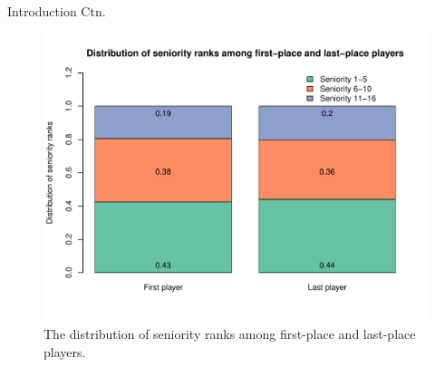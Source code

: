 \begin{frame}{Introduction Ctn.}
    \begin{figure}
        \centering
        \includegraphics[width=.9\linewidth]{img/seniority.pdf}
        \caption{The distribution of seniority ranks among first-place and last-place players.}
        \label{fig:seniority}
    \end{figure}
\end{frame}
